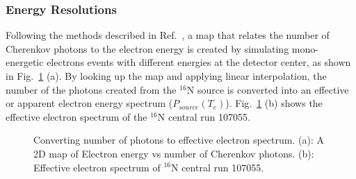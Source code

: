 \subsubsection{Energy Resolutions}
Following the methods described in Ref.~\cite{askins2015physics,waterunidoc}, a map that relates the number of Cherenkov photons to the electron energy is created by simulating mono-energetic electrons events with different energies at the detector center, as shown in Fig.~\ref{N16energyMap} (a). By looking up the map and applying linear interpolation, the number of the photons created from the $^{16}$N source is converted into an effective or apparent electron energy spectrum ($P_{source}(T_e)$)\cite{waterunidoc}. Fig.~\ref{N16energyMap} (b) shows the effective electron spectrum of the $^{16}$N central run 107055.

\begin{figure}[htbp]
	\centering
	\caption[Converting number of photons to effective electron spectrum.]{Converting number of photons to effective electron spectrum. (a): A 2D map of Electron energy vs number of Cherenkov photons. (b):	Effective electron spectrum of $^{16}$N central run 107055.\label{N16energyMap}}
\end{figure}

